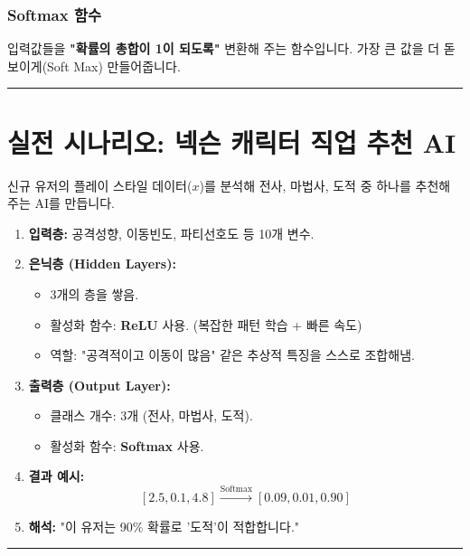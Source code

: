 \documentclass[11pt,a4paper]{book}
\theoremstyle{definition}
\begin{document}
\subsubsection*{Softmax 함수}
입력값들을 \textbf{"확률의 총합이 1이 되도록"} 변환해 주는 함수입니다. 가장 큰 값을 더 돋보이게(Soft Max) 만들어줍니다.

\vspace{0.5cm}\hrule\vspace{0.5cm}

\section{실전 시나리오: 넥슨 캐릭터 직업 추천 AI}

\begin{storybox}[title={Scenario: 뉴비에게 딱 맞는 직업은?}]
신규 유저의 플레이 스타일 데이터($x$)를 분석해 전사, 마법사, 도적 중 하나를 추천해 주는 AI를 만듭니다.
\end{storybox}

\begin{enumerate}
    \item \textbf{입력층:} 공격성향, 이동빈도, 파티선호도 등 10개 변수.
    \item \textbf{은닉층 (Hidden Layers):}
    \begin{itemize}
        \item 3개의 층을 쌓음.
        \item 활성화 함수: \textbf{ReLU} 사용. (복잡한 패턴 학습 + 빠른 속도)
        \item 역할: "공격적이고 이동이 많음" 같은 추상적 특징을 스스로 조합해냄.
    \end{itemize}
    \item \textbf{출력층 (Output Layer):}
    \begin{itemize}
        \item 클래스 개수: 3개 (전사, 마법사, 도적).
        \item 활성화 함수: \textbf{Softmax} 사용.
    \end{itemize}
    \item \textbf{결과 예시:}
    $$ [2.5, 0.1, 4.8] \xrightarrow{\text{Softmax}} [0.09, 0.01, 0.90] $$
    \item \textbf{해석:} "이 유저는 90\% 확률로 '도적'이 적합합니다."
\end{enumerate}

\vspace{0.5cm}\hrule\vspace{0.5cm}
\end{document}
